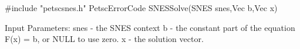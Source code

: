 #include "petscsnes.h"  
PetscErrorCode  SNESSolve(SNES snes,Vec b,Vec x)

Input Parameters:
snes - the SNES context
b - the constant part of the equation F(x) = b, or NULL to use zero.
x - the solution vector. 
